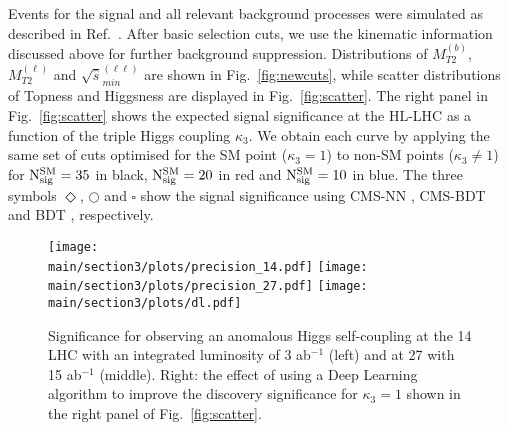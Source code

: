 Events for the signal and all relevant background processes were simulated as described in Ref.~\cite{Kim:2018cxf}. After basic selection cuts, we use the kinematic information  discussed above for further background suppression. Distributions of $M_{T2}^{(b)}$, $M_{T2}^{(\ell)}$ and $\sqrt{\hat{s}}_{min}^{(\ell\ell)}$ are shown in Fig.~\ref{fig:newcuts}, while scatter distributions of Topness and Higgsness are displayed in Fig.~\ref{fig:scatter}. 
%
The right panel in Fig.~\ref{fig:scatter} shows the expected signal significance at the HL-LHC as a function of the triple Higgs coupling $\kappa_3$. We obtain each curve by applying the same set of cuts optimised for the SM point ($\kappa_3=1$) to non-SM points ($\kappa_3 \neq 1$) for ${\rm N_{sig}^{SM}}=35$ in black, ${\rm N_{sig}^{SM}}=20$ in red and ${\rm N_{sig}^{SM}}=10$ in blue. The three symbols {\color{red}$\Diamond$}, {\color{black}$\bigcirc$} and {\color{blue}$\square$} show the signal significance using CMS-NN \cite{CMS:2015nat}, CMS-BDT \cite{CMS:2017cwx} and BDT \cite{Adhikary:2017jtu}, respectively.




%
\begin{figure}[t]
\centering
\texttt{[image: \\main/section3/plots/precision\_14.pdf]}   \hspace*{0.cm}
\texttt{[image: \\main/section3/plots/precision\_27.pdf]}   \hspace*{-0.cm}
\texttt{[image: \\main/section3/plots/dl.pdf]}   
\caption{\label{fig:k3precision} 
Significance for observing an anomalous Higgs self-coupling at the 14 \UTeV LHC with an integrated luminosity of 3 ab$^{-1}$ (left) and at 27 \UTeV with 15 ab$^{-1}$ (middle).
Right: the effect of using a Deep Learning algorithm to improve the discovery significance for $\kappa_3=1$ shown in 
the right panel of Fig.~\ref{fig:scatter}.
}
\end{figure}
%


